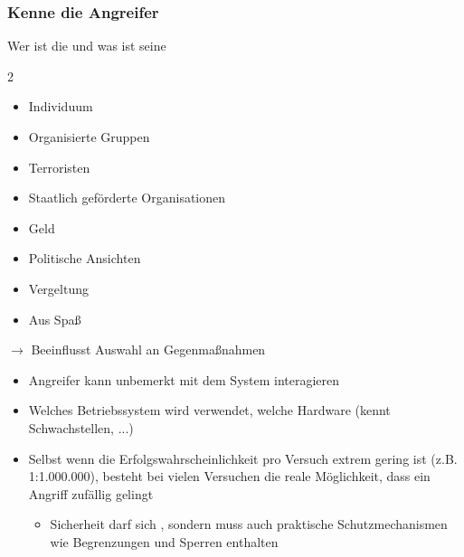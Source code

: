 \subsubsection*{Kenne die Angreifer}
 Wer ist die  und was ist seine 
\begin{multicols}{2}
    \begin{itemize}
        \item Individuum
        \item Organisierte Gruppen
        \item Terroristen
        \item Staatlich geförderte Organisationen
    \end{itemize}
    \columnbreak
    \begin{itemize}
        \item Geld
        \item Politische Ansichten
        \item Vergeltung
        \item Aus Spaß
    \end{itemize}
\end{multicols}
$\rightarrow$ Beeinflusst Auswahl an Gegenmaßnahmen\\
\begin{itemize}
    \item {} Angreifer kann unbemerkt mit dem System interagieren
    \item {} Welches Betriebssystem wird verwendet, welche Hardware (kennt Schwachstellen, ...)
    \item {} Selbst wenn die Erfolgswahrscheinlichkeit pro Versuch extrem gering ist (z.B. 1:1.000.000), besteht bei vielen Versuchen die reale Möglichkeit, dass ein Angriff zufällig gelingt
    \begin{itemize}
        \item Sicherheit darf sich , sondern muss auch praktische Schutzmechanismen wie Begrenzungen und Sperren enthalten
    \end{itemize}
\end{itemize}
